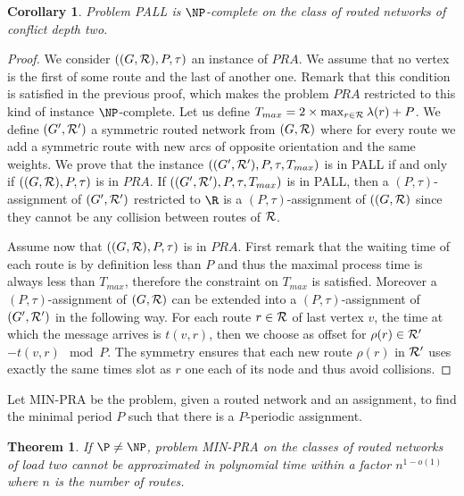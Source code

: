 \documentclass[10pt, conference, letterpaper]{IEEEtran}
\newtheorem{theorem}{Theorem}
\newtheorem{corollary}{Corollary}
\begin{document}
\begin{corollary}
Problem PALL is $\NP$-complete on the class of routed networks of conflict depth two.
\end{corollary}
\begin{proof}
 We consider $((G,{\cal R}),P,\tau)$ an instance of $PRA$. We assume that no vertex is the first of some route and the last of another one. Remark that this condition is satisfied in the previous proof, which makes the problem $PRA$ restricted to this kind of instance $\NP$-complete. 
 Let us define $T_{max} = 2 \times \max_{r \in {\cal R}} \lambda(r) + P$. We define $(G',{\cal R}')$ a symmetric routed network from $(G,{\cal R})$ where for every route we add a symmetric route with new arcs of opposite orientation and the same weights.
 We prove that the instance $((G',{\cal R'}),P,\tau,T_{max})$ is in PALL if and only if $((G,{\cal R}),P,\tau)$ is in $PRA$.
 If $((G',{\cal R'}),P,\tau,T_{max})$ is in PALL, then a $(P,\tau)$-assignment of $(G',{\cal R'})$ restricted to $\R$ is a $(P,\tau)$-assignment of $((G,{\cal R})$ since they cannot be any collision between routes of ${\cal R}$.
 
 Assume now that $((G,{\cal R}),P,\tau)$ is in $PRA$. First remark that the waiting time of each route is by definition less than $P$ and thus the maximal process time is always less than $T_{max}$, therefore the constraint on $T_{max}$ is satisfied. Moreover a $(P,\tau)$-assignment of $(G,{\cal R})$ can be extended into a $(P,\tau)$-assignment of $(G',{\cal R'})$ in the following way. For each route $r \in \cal{R}$ of last vertex $v$, the time at which the message arrives is $t(v,r)$, then we choose as offset for $\rho(r) \in \cal{R}'$ $-t(v,r) \mod P$. The symmetry ensures that each new route $\rho(r)$ in ${\cal R'}$ uses exactly the same times slot as $r$ one each of its node and thus avoid collisions.
\end{proof}

Let MIN-PRA be the problem, given a routed network and an assignment, to find the minimal period $P$ such that there is a $P$-periodic assignment. 

\begin{theorem}\label{th:inapprox}
If $\P \neq \NP$, problem MIN-PRA on the classes of routed networks of load two cannot be approximated in polynomial time within a factor $n^{1-o(1)}$ where $n$ is the number of routes.
\end{theorem}
\end{document}
